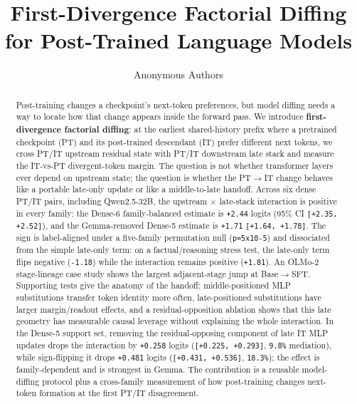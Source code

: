 \documentclass[11pt]{article}
\title{First-Divergence Factorial Diffing for Post-Trained Language Models}
\author{Anonymous Authors}
\date{}
\begin{document}
\maketitle



\begin{abstract}

Post-training changes a checkpoint's next-token preferences, but model diffing needs a way to locate how that change appears inside the forward pass. We introduce \textbf{first-divergence factorial diffing}: at the earliest shared-history prefix where a pretrained checkpoint (PT) and its post-trained descendant (IT) prefer different next tokens, we cross PT/IT upstream residual state with PT/IT downstream late stack and measure the IT-vs-PT divergent-token margin. The question is not whether transformer layers ever depend on upstream state; the question is whether the PT\ensuremath{\to}IT change behaves like a portable late-only update or like a middle-to-late handoff. Across six dense PT/IT pairs, including Qwen2.5-32B, the upstream \ensuremath{\times} late-stack interaction is positive in every family: the Dense-6 family-balanced estimate is \texttt{+2.44} logits (95\% CI \texttt{[+2.35, +2.52]}), and the Gemma-removed Dense-5 estimate is \texttt{+1.71} \texttt{[+1.64, +1.78]}. The sign is label-aligned under a five-family permutation null (\texttt{p=5x10-5}) and dissociated from the simple late-only term: on a factual/reasoning stress test, the late-only term flips negative (\texttt{-1.18}) while the interaction remains positive (\texttt{+1.81}). An OLMo-2 stage-lineage case study shows the largest adjacent-stage jump at Base\ensuremath{\to}SFT. Supporting tests give the anatomy of the handoff: middle-positioned MLP substitutions transfer token identity more often, late-positioned substitutions have larger margin/readout effects, and a residual-opposition ablation shows that this late geometry has measurable causal leverage without explaining the whole interaction. In the Dense-5 support set, removing the residual-opposing component of late IT MLP updates drops the interaction by \texttt{+0.258} logits (\texttt{[+0.225, +0.293]}, \texttt{9.8\%} mediation), while sign-flipping it drops \texttt{+0.481} logits (\texttt{[+0.431, +0.536]}, \texttt{18.3\%}); the effect is family-dependent and is strongest in Gemma. The contribution is a reusable model-diffing protocol plus a cross-family measurement of how post-training changes next-token formation at the first PT/IT disagreement.


\end{abstract}
\end{document}
